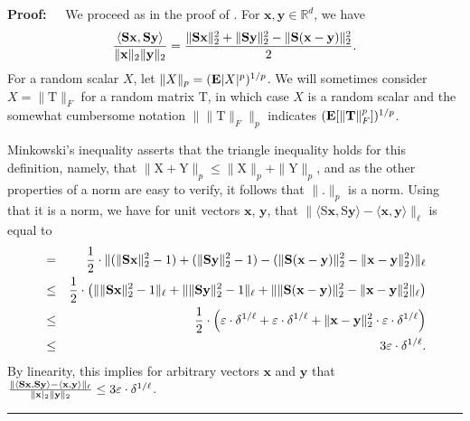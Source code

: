 \documentclass[11pt]{article}
\newenvironment{proof}{\begin{trivlist} \item {\bf Proof:~~}}
  {\qed\end{trivlist}}
\newcommand{\mat}[1]{{\ensuremath{\bm{\mathrm{#1}}}}}
\def\matS{\mat{S}}
\def\matT{\mat{T}}
\def\matX{\mat{X}}
\def\matY{\mat{Y}}
\def\frac#1#2{{#1\over #2}}
\def\qed{\hfill\rule{2mm}{2mm}}
\def\x{{\mathbf x}}
\def\y{{\mathbf y}}
\newcommand{\eps}{\varepsilon}
\begin{document}
\begin{proof}
We proceed as in the proof of \cite{kn14}. 
For $\x, \y \in \mathbb{R}^d$, we have
$$\frac{\langle \matS\x, \matS\y \rangle}{\|\x\|_2 \|\y\|_2} = \frac{\|\matS\x\|_2^2 + \|\matS\y\|_2^2 - \|\matS(\x-\y)\|_2^2}{2}.$$
For a random scalar $X$, let $\|X\|_p = ({\bf E}|X|^p)^{1/p}$. 
We will sometimes consider $X = \|\matT\|_F$ for a random matrix $\matT$, 
in which case $X$ is a random scalar
and the somewhat cumbersome notation $\|\|\matT\|_F\|_p$ indicates $({\bf E}[\|\matT\|_F^p])^{1/p}$. 

Minkowski's inequality asserts that the triangle
inequality holds for this definition, namely, that $\|\matX+\matY\|_p \leq \|\matX\|_p + \|\matY\|_p$, and as the
other properties of a norm are easy to verify, it follows that $\|.\|_p$ is a norm. Using that it is a norm, we have
for unit vectors $\x$, $\y$, that $\|\langle \matS \x, \matS \y \rangle - \langle \x, \y \rangle\|_{\ell}$ is equal to
\begin{eqnarray*}
& = & \frac{1}{2} \cdot \|(\|\matS \x\|_2^2 - 1 ) + (\|\matS \y\|_2^2-1)
 - (\|\matS(\x-\y)\|_2^2 - \|\x-\y\|_2^2)\|_{\ell}\\
& \leq & \frac{1}{2} \cdot \left (\|\|\matS \x\|_2^2-1\|_{\ell} + \|\|\matS\y\|_2^2-1\|_{\ell}
+ \|\|\matS(\x-\y)\|_2^2 - \|\x-\y\|_2^2\|_{\ell} \right )\\
& \leq & \frac{1}{2} \cdot \left (\eps \cdot \delta^{1/\ell} + \eps \cdot \delta^{1/\ell} + \|\x-\y\|_2^2 \cdot \eps \cdot \delta^{1/\ell} \right )\\
& \leq & 3\eps \cdot \delta^{1/\ell}.
\end{eqnarray*}
By linearity, this implies for arbitrary vectors $\x$ and $\y$ that
$\frac{\|\langle \matS \x, \matS \y \rangle - \langle \x, \y \rangle \|_{\ell}}{\|\x|_2 \|\y\|_2} \leq 3 \eps \cdot \delta^{1/\ell}$. 


\end{proof}
\end{document}
